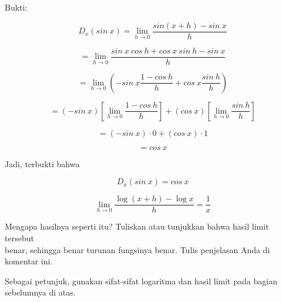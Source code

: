 \documentclass{article}
\begin{document}
\begin{eulernotebook}
\begin{eulercomment}
\begin{eulercomment}
\begin{eulercomment}
Bukti:\\
\end{eulercomment}
\begin{eulerformula}
\[
D_x(sin\ x)=\lim_{h\to 0} \frac{sin(x+h)-sin\ x}{h}
\]
\end{eulerformula}
\begin{eulerformula}
\[
=\lim_{h\to 0} \frac{sin\ x\ cos\ h+cos\ x\ sin\ h-sin\ x}{h}
\]
\end{eulerformula}
\begin{eulerformula}
\[
=\lim_{h\to 0} (-sin\ x\frac{1-cos\ h}{h}+cos\ x\frac{sin\ h}{h})
\]
\end{eulerformula}
\begin{eulerformula}
\[
=(-sin\ x)\left [\lim_{h\to 0} \frac{1-cos\ h}{h} \right ]+(cos\ x)\left [\lim_{h\to 0} \frac{sin\ h}{h}\right ]
\]
\end{eulerformula}
\begin{eulerformula}
\[
=(-sin\ x)\cdot 0+(cos\ x)\cdot 1
\]
\end{eulerformula}
\begin{eulerformula}
\[
=cos\ x
\]
\end{eulerformula}
\begin{eulercomment}
Jadi, terbukti bahwa\\
\end{eulercomment}
\begin{eulerformula}
\[
D_x(sin\ x)=cos\ x
\]
\end{eulerformula}
\begin{eulerformula}
\[
\lim_{h\rightarrow 0}{\frac{\log \left(x+h\right)-\log x}{h}}=  \frac{1}{x}
\]
\end{eulerformula}
\begin{eulercomment}
Mengapa hasilnya seperti itu? Tuliskan atau tunjukkan bahwa hasil
limit tersebut\\
benar, sehingga benar turunan fungsinya benar.  Tulis penjelasan Anda
di komentar ini.

Sebagai petunjuk, gunakan sifat-sifat logaritma dan hasil limit pada
bagian sebelumnya di atas.


\end{eulercomment}
\end{eulercomment}
\end{eulercomment}
\end{eulernotebook}
\end{document}
